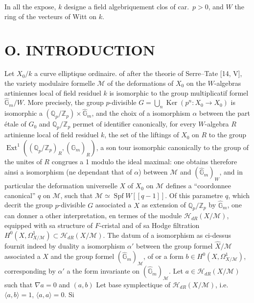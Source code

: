 \documentclass[12pt,a4paper]{article}
\theoremstyle{plain}
\theoremstyle{definition}
\theoremstyle{remark}
\DeclareMathOperator{\Spf}{Spf}
\DeclareMathOperator{\Ker}{Ker}
\DeclareMathOperator{\Ext}{Ext}
\begin{document}
\medskip
In all the expose, $k$ designe a field algebriquement clos of car.\ $p > 0$, and $W$ the ring of the vecteurs of Witt on $k$.

\newpage
\setcounter{page}{81}

\section*{O. INTRODUCTION}

Let $X_0/k$ a curve elliptique ordinaire. of after the theorie of Serre--Tate [14, V], the variety modulaire formelle $\mathcal{M}$ of the deformations of $X_0$ on the $W$-algebras artiniennes local of field residuel $k$ is isomorphic to the group multiplicatif formel $\widehat{\mathbb{G}}_m/W$. More precisely, the group $p$-divisible $G = \bigcup_n \Ker(p^n : X_0 \to X_0)$ is isomorphic a $(\mathbb{Q}_p/\mathbb{Z}_p) \times \widehat{\mathbb{G}}_m$, and the choix of a isomorphism $\alpha$ between the part étale of $G_0$ and $\mathbb{Q}_p/\mathbb{Z}_p$ permet of identifier canonically, for every $W$-algebra $R$ artinienne local of field residuel $k$, the set of the liftings of $X_0$ on $R$ to the group $\Ext^1((\mathbb{Q}_p/\mathbb{Z}_p)_R, (\widehat{\mathbb{G}}_m)_R)$, a son tour isomorphic canonically to the group of the unites of $R$ congrues a 1 modulo the ideal maximal: one obtains therefore ainsi a isomorphism (ne dependant that of $\alpha$) between $\mathcal{M}$ and $(\widehat{\mathbb{G}}_m)_W$, and in particular the deformation universelle $X$ of $X_0$ on $\mathcal{M}$ defines a ``coordonnee canonical'' $q$ on $\mathcal{M}$, such that $\mathcal{M} \simeq \Spf W[[q-1]]$. Of this parametre $q$, which decrit the group $p$-divisible $G$ associated a $X$ as extension of $\mathbb{Q}_p/\mathbb{Z}_p$ by $\widehat{\mathbb{G}}_m$, one can donner a other interpretation, en termes of the module $\mathcal{H}_{dR}(X/\mathcal{M})$, equipped with sa structure of $F$-cristal and of sa Hodge filtration $H^0(X,\Omega^1_{X/\mathcal{M}}) \subset \mathcal{H}_{dR}(X/\mathcal{M})$. The datum of a isomorphism as ci-dessus fournit indeed by duality a isomorphism $\alpha'$ between the group formel $\widehat{X}/\mathcal{M}$ associated a $X$ and the group formel $(\widehat{\mathbb{G}}_m)_{\mathcal{M}}$, of or a form $b \in H^0(X,\Omega^1_{X/\mathcal{M}})$, corresponding by $\alpha'$ a the form invariante on $(\widehat{\mathbb{G}}_m)_{\mathcal{M}}$. Let $a \in \mathcal{H}_{dR}(X/\mathcal{M})$ such that $\nabla a = 0$ and $(a,b)$ Let base symplectique of $\mathcal{H}_{dR}(X/\mathcal{M})$, i.e.\ $\langle a,b \rangle = 1$, $\langle a,a \rangle = 0$. Si
\end{document}
